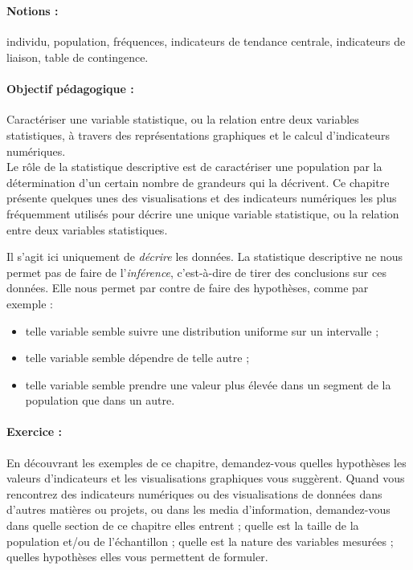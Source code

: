 \label{chap:stat_descr}
\,
\paragraph{Notions :} individu, population, fréquences, indicateurs de tendance
centrale, indicateurs de liaison, table de contingence.

\paragraph{Objectif pédagogique :}
Caractériser une variable statistique, ou la relation entre deux variables
statistiques, à travers des représentations graphiques et le calcul
d'indicateurs numériques.\\

Le rôle de la statistique descriptive est de caractériser une population par la
détermination d'un certain nombre de grandeurs qui la décrivent. Ce chapitre
présente quelques unes des visualisations et des indicateurs numériques les
plus fréquemment utilisés pour décrire une unique variable statistique, ou la
relation entre deux variables statistiques.

Il s'agit ici uniquement de \textit{décrire} les données. La statistique
descriptive ne nous permet pas de faire de l'\textit{inférence}, c'est-à-dire
de tirer des conclusions sur ces données. Elle nous permet par contre de faire
des hypothèses, comme par exemple :
\begin{itemize}
	\item telle variable semble suivre une distribution uniforme sur un intervalle ;
	\item telle variable semble dépendre de telle autre ;
	\item telle variable semble prendre une valeur plus élevée dans un segment de
	la population que dans un autre.
\end{itemize}

\paragraph{Exercice :} En découvrant les exemples de ce chapitre, demandez-vous
quelles hypothèses les valeurs d'indicateurs et les visualisations graphiques
vous suggèrent.  Quand vous rencontrez des indicateurs numériques ou des
visualisations de données dans d'autres matières ou projets, ou dans les media
d'information, demandez-vous dans quelle section de ce chapitre elles entrent ;
quelle est la taille de la population et/ou de l'échantillon ; quelle est la
nature des variables mesurées ; quelles hypothèses elles vous permettent de
formuler.


